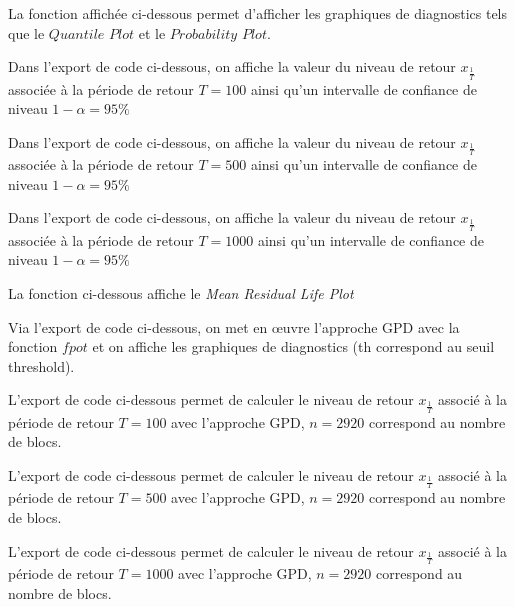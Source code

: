 \documentclass[a4paper,french,10pt]{article}
\begin{document}
La fonction affichée ci-dessous permet d'afficher les graphiques de diagnostics tels que le $Quantile$ $Plot$ et le $Probability$ $Plot$.


Dans l'export de code ci-dessous, on affiche la valeur du niveau de retour $x_{\frac{1}{T}}$ associée à la période de retour $T=100$ ainsi qu'un intervalle de confiance de niveau $1- \alpha = 95\%$


Dans l'export de code ci-dessous, on affiche la valeur du niveau de retour $x_{\frac{1}{T}}$ associée à la période de retour $T=500$ ainsi qu'un intervalle de confiance de niveau $1- \alpha = 95\%$


\newpage

Dans l'export de code ci-dessous, on affiche la valeur du niveau de retour $x_{\frac{1}{T}}$ associée à la période de retour $T=1000$ ainsi qu'un intervalle de confiance de niveau $1- \alpha = 95\%$


La fonction ci-dessous affiche le \textit{Mean Residual Life Plot}


Via l'export de code ci-dessous, on met en œuvre l'approche GPD avec la fonction $fpot$ et on affiche les graphiques de diagnostics (th correspond au seuil threshold).


L'export de code ci-dessous permet de calculer le niveau de retour $x_{\frac{1}{T}}$ associé à la période de retour $T = 100$ avec l'approche GPD, $n = 2920$ correspond au nombre de blocs.


L'export de code ci-dessous permet de calculer le niveau de retour $x_{\frac{1}{T}}$ associé à la période de retour $T = 500$ avec l'approche GPD, $n = 2920$ correspond au nombre de blocs.


L'export de code ci-dessous permet de calculer le niveau de retour $x_{\frac{1}{T}}$ associé à la période de retour $T = 1000$ avec l'approche GPD, $n = 2920$ correspond au nombre de blocs.

\end{document}
